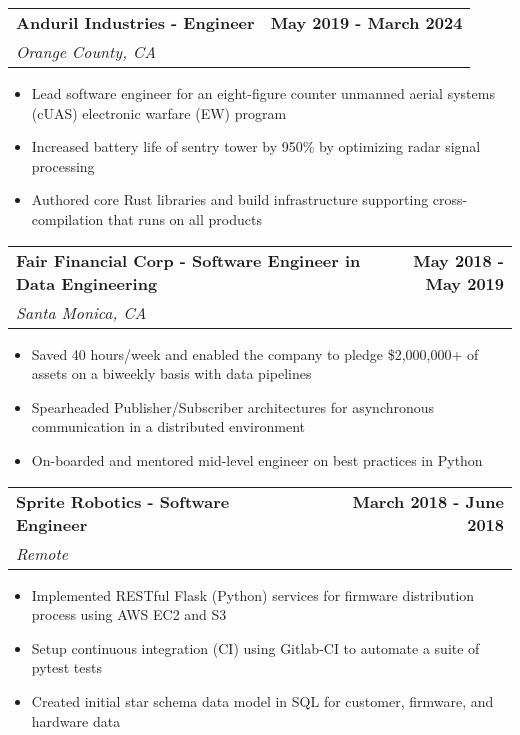 \documentclass[letterpaper]{article}
\newenvironment{details}
{\begin{itemize}}
{\end{itemize}}
\begin{document}
\noindent
\begin{tabularx}{\textwidth}{@{}X r@{}}
        \textbf{Anduril Industries - Engineer} & \textbf{May 2019 - March 2024} \\
        \textit{Orange County, CA}
\end{tabularx}
\begin{details}
    \item Lead software engineer for an eight-figure counter unmanned aerial systems (cUAS) electronic warfare (EW) program
    \item Increased battery life of sentry tower by 950\% by optimizing radar signal processing
    \item Authored core Rust libraries and build infrastructure supporting cross-compilation that runs on all products
\end{details}
\noindent
\begin{tabularx}{\textwidth}{@{}X r@{}}
        \textbf{Fair Financial Corp - Software Engineer in Data Engineering} & \textbf{May 2018 - May 2019} \\
        \textit{Santa Monica, CA}
\end{tabularx}
\begin{details}
        \item Saved 40 hours/week and enabled the company to pledge \$2,000,000+ of assets on a biweekly basis with data pipelines
        \item Spearheaded Publisher/Subscriber architectures for asynchronous communication in a distributed environment
        \item On-boarded and mentored mid-level engineer on best practices in Python
\end{details}
    \noindent
  \begin{tabularx}{\textwidth}{@{}X r@{}}
        \textbf{Sprite Robotics - Software Engineer} & \textbf{March 2018 - June 2018} \\
        \textit{Remote}
  \end{tabularx}
  \begin{details}
        \item Implemented RESTful Flask (Python) services for firmware distribution process using AWS EC2 and S3
        \item Setup continuous integration (CI) using Gitlab-CI to automate a suite of pytest tests
        \item Created initial star schema data model in SQL for customer, firmware, and hardware data
  \end{details}
\end{document}
